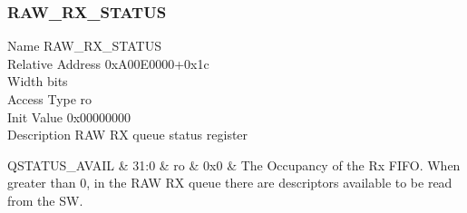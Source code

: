 \documentclass[10pt,a4paper]{paper}
\begin{document}
\subsubsection{RAW\_RX\_STATUS} \label{reg:raw_rx_status}
\begin{regdescription}
	Name			\> RAW\_RX\_STATUS\\
	Relative Address	\> 0xA00E0000+0x1c\\
	Width			 bits\\
	Access Type		\> ro\\
	Init Value		\> 0x00000000\\
	Description		\> RAW RX queue status register\\
\end{regdescription}
\begin{regdetails}
	\hline QSTATUS\_AVAIL & 31:0 & ro & 0x0 & The Occupancy of the Rx FIFO. When greater than 0, in the RAW RX
	queue there are descriptors available to be read from the SW.\\
\end{regdetails}
\end{document}
